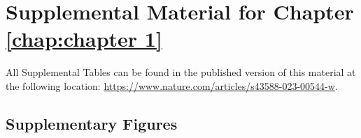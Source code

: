 \appendix{}

\chapter{Supplemental Material for Chapter \ref{chap:chapter 1}}

All Supplemental Tables can be found in the published version of this material at the following location: \url{https://www.nature.com/articles/s43588-023-00544-w}.

\section{Supplementary Figures}

